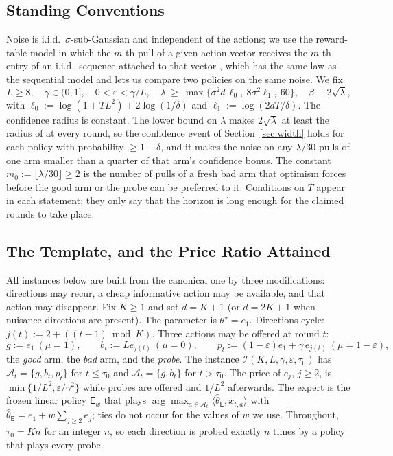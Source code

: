 \documentclass[anon]{alt2027} %
\newcommand{\eps}{\varepsilon}
\newcommand{\Exp}{\mathsf{E}}
\begin{document}
\subsection{Standing Conventions}
\label{sec:template}

Noise is i.i.d.\ $\sigma$-sub-Gaussian and independent of the actions; we use
the reward-table model in which the $m$-th pull of a given action vector
receives the $m$-th entry of an i.i.d.\ sequence attached to that vector
\citep[\S4.6]{lattimore2020bandit}, which has the same law as the sequential
model and lets us compare two policies on the same noise. We fix
\begin{equation}
\label{eq:conventions}
L\ge8,\quad \gamma\in(0,1],\quad 0<\eps<\gamma/L,\quad
\lambda\ \ge\ \max\bigl\{\sigma^2d\,\ell_0,\ 8\sigma^2\ell_1,\ 60\bigr\},\quad
\beta\equiv2\sqrt\lambda,
\end{equation}
with $\ell_0:=\log(1+TL^2)+2\log(1/\delta)$ and $\ell_1:=\log(2dT/\delta)$.
The confidence radius is constant. The lower bound on $\lambda$ makes
$2\sqrt\lambda$ at least the radius of \citet{abbasi2011improved} at every
round, so the confidence event of Section~\ref{sec:width} holds for each
policy with probability $\ge1-\delta$, and it makes the noise on any $\lambda/30$
pulls of one arm smaller than a quarter of that arm's confidence bonus. The
constant $m_0:=\lfloor\lambda/30\rfloor\ge2$ is the number of pulls of a
fresh bad arm that optimism forces before the good arm or the probe can be
preferred to it. Conditions on $T$ appear in each statement; they only say
that the horizon is long enough for the claimed rounds to take place.


\subsection{The Template, and the Price Ratio Attained}
\label{app:template-thm}

All instances below are built from the canonical one by three modifications:
directions may recur, a cheap informative action may be available, and that
action may disappear. Fix $K\ge1$ and set $d=K+1$ (or $d=2K+1$ when nuisance
directions are present). The parameter is $\theta^\star=e_1$. Directions
cycle: $j(t):=2+((t-1)\bmod K)$. Three actions may be offered at round $t$:
\[
g:=e_1\ (\mu=1),\qquad
b_t:=Le_{j(t)}\ (\mu=0),\qquad
p_t:=(1-\eps)e_1+\gamma\,e_{j(t)}\ (\mu=1-\eps),
\]
the \emph{good} arm, the \emph{bad} arm, and the \emph{probe}. The instance
$\mathcal I(K,L,\gamma,\eps,\tau_0)$ has $\mathcal A_t=\{g,b_t,p_t\}$ for $t\le\tau_0$
and $\mathcal A_t=\{g,b_t\}$ for $t>\tau_0$. The price of $e_j$, $j\ge2$, is
$\min\{1/L^2,\eps/\gamma^2\}$ while probes are offered and $1/L^2$ afterwards. The
expert is the frozen linear policy $\Exp_w$ that plays
$\arg\max_{a\in\mathcal A_t}\langle\widehat\theta_{\Exp},x_{t,a}\rangle$ with
$\widehat\theta_{\Exp}=e_1+w\sum_{j\ge2}e_j$; ties do not occur for the values
of $w$ we use. Throughout, $\tau_0=Kn$ for an integer $n$, so each direction is
probed exactly $n$ times by a policy that plays every probe.
\end{document}
